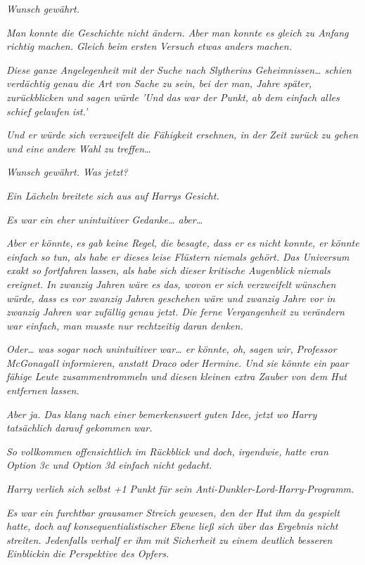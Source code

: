 {\emph{Wunsch gewährt.}

\emph{Man konnte die Geschichte nicht ändern. Aber man konnte es gleich zu Anfang richtig machen. Gleich beim} \emph{\emph{ersten}} \emph{Versuch etwas anders machen.}

\emph{Diese} \emph{ganze} \emph{Angelegenheit} \emph{mit der Suche nach Slytherins Geheimnissen… schien verdächtig genau die Art von Sache zu sein, bei der man, Jahre später, zurückblicken und sagen würde 'Und} \emph{\emph{das}} \emph{war der Punkt,} \emph{ab dem einfach alles schief gelaufen} \emph{ist.'}

\emph{Und er würde sich verzweifelt die Fähigkeit ersehnen, in der Zeit zurück zu gehen und eine andere Wahl zu treffen…}

\emph{Wunsch gewährt. Was jetzt?}

\emph{Ein Lächeln breitete sich aus auf Harrys Gesicht.}

\emph{Es war ein eher} \emph{\emph{unintuitiver}} \emph{Gedanke… aber…}

\emph{Aber er} \emph{\emph{könnte,}} \emph{es gab keine Regel, die besagte, dass er es nicht konnte, er} \emph{\emph{könnte}} \emph{einfach so tun, als habe er dieses leise Flüstern niemals gehört. Das Universum exakt so fortfahren lassen, als habe sich dieser kritische Augenblick niemals ereignet. In zwanzig Jahren wäre es das, wovon er sich verzweifelt wünschen würde, dass es vor zwanzig Jahren geschehen wäre und zwanzig Jahre vor in zwanzig Jahren war zufällig genau jetzt. Die ferne Vergangenheit zu verändern war einfach, man musste nur rechtzeitig daran denken.}

\emph{Oder… was sogar} \emph{\emph{noch}} \emph{unintuitiver war… er könnte, oh, sagen wir,} \emph{\emph{Professor McGonagall}} \emph{informieren, anstatt Draco} \emph{\emph{oder}} \emph{Hermine. Und sie könnte ein paar fähige Leute zusammentrommeln und diesen kleinen extra Zauber von dem Hut entfernen lassen.}

\emph{Aber ja. Das klang nach einer} \emph{\emph{bemerkenswert}} \emph{guten Idee, jetzt wo} \emph{Harry tatsächlich} \emph{\emph{darauf gekommen}} \emph{war.}

\emph{So vollkommen offensichtlich im Rückblick und doch, irgendwie,} \emph{hatte eran} \emph{Option 3c und Option 3d einfach nicht gedacht.}

\emph{Harry verlieh sich selbst +1 Punkt für sein Anti-Dunkler-Lord-Harry-Programm.}

\emph{Es war ein furchtbar grausamer Streich gewesen, den der Hut ihm da gespielt hatte, doch auf konsequentialistischer Ebene ließ sich über das Ergebnis nicht streiten. Jedenfalls verhalf er ihm mit Sicherheit zu einem deutlich besseren} \emph{Einblickin} \emph{die Perspektive des Opfers.}

}
